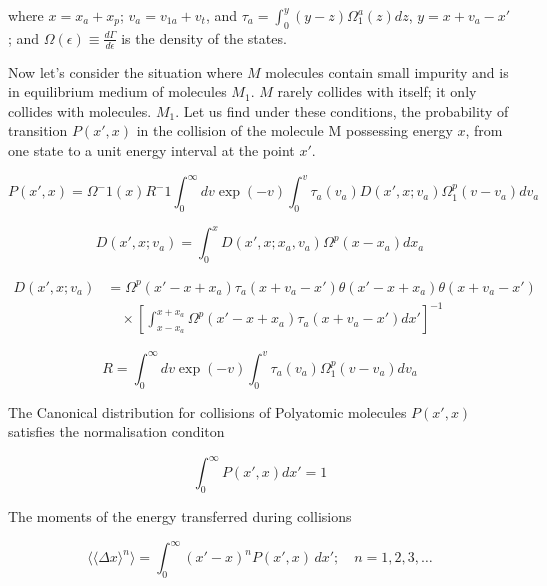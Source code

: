 \documentclass{article}
\begin{document}
where $x=x_a+x_p$; $v_a=v_{1a}+v_t$, and $\tau_a=\int_{0}^y(y-z)\Omega_1^a(z)dz$, $ y=x+v_a-x'$; and $\Omega(\epsilon)\equiv\frac{d\Gamma}{d\epsilon}$ is the density of the states.


Now let's consider the situation where $M$ molecules contain small impurity and is in equilibrium medium of molecules $M_1$.  
$M$ rarely collides with itself; it only collides with molecules.
 $M_1$. 
 Let us find under these
conditions,  the probability of transition $P(x', x)$ in the collision of the molecule M possessing 
energy $x$, from one state to a unit energy interval at the point $x'$.  
    
\begin{equation}
    P(x',x)= \Omega^-1(x)R^-1 \int_{0}^\infty dv\exp (-v)\int_{0}^v\tau_a(v_a)D(x',x;v_a)\Omega_1^p(v-v_a)dv_a
    \label{7}
\end{equation}

\begin{equation}
    D(x',x;v_a)=\int_{0}^x D(x',x;x_a,v_a)\Omega^p(x-x_a)dx_a
    \label{8}
\end{equation}

\begin{equation}
\begin{aligned}
    D(x',x;v_a) &= \Omega^p(x'-x+x_a)\tau_a(x+v_a-x')\theta(x'-x+x_a) \theta(x+v_a-x') \\
    &\quad \times \left[\int_{x-x_a}^{x+x_a}\Omega^p(x'-x+x_a)\tau_a(x+v_a-x')dx'\right]^{-1}
\end{aligned}
\label{9}
\end{equation}



$$R=\int_{0}^\infty dv\exp(-v)\int_{0}^v\tau_a(v_a)\Omega_1^p(v-v_a)dv_a$$


The Canonical distribution for collisions of Polyatomic molecules $P(x',x)$ satisfies the normalisation conditon

\begin{equation}
    \int_{0}^\infty P(x',x)dx'=1
    \label{10}
\end{equation}





The moments of the energy transferred during collisions

\begin{equation}
  \langle  \langle \Delta x \rangle^n \rangle= \int_{0}^{\infty} (x' - x)^n P(x',x) \, dx'; \quad n = 1,2,3,\ldots
\label{11}
\end{equation}
\end{document}
